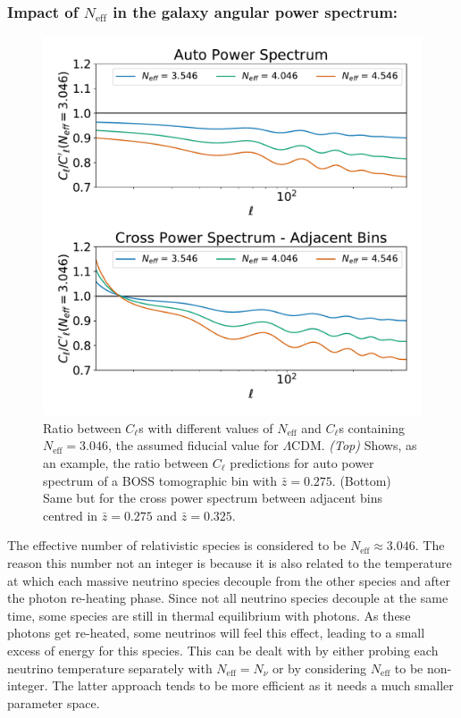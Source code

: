 \subsubsection{Impact of $N_{\text{eff}}$ in the galaxy angular power spectrum:}
\begin{figure}
\begin{center}
\includegraphics[scale=0.50]{Neutrino-FIGS/Neutrinos_Neff.pdf}
\caption[Impact of the effective number of relativistic species in the angular power spectra of galaxies.]{Ratio between $C_{\ell}$s with different values of $N_{\text{eff}}$ and $C_{\ell}$s containing $N_{\text{eff}} = 3.046$, the assumed fiducial value for $\Lambda$CDM. \textit{(Top)} Shows, as an example, the ratio between $C_{\ell}$ predictions for auto power spectrum of a BOSS tomographic bin with $\bar{z} = 0.275$. (Bottom) Same but for the cross power spectrum between adjacent bins centred in $\bar{z} = 0.275$ and $\bar{z} = 0.325$.}
\label{fig:neutrinoCompareNeff}
\end{center}
\end{figure}

The effective number of relativistic species is considered to be $N_{\text{eff}}\approx 3.046$. The reason this number not an integer is because it is also related to the temperature at which each massive neutrino species decouple from the other species and after the photon re-heating phase. Since not all neutrino species decouple at the same time, some species are still in thermal equilibrium with photons. As these photons get re-heated, some neutrinos will feel this effect, leading to a small excess of energy for this species. This can be dealt with by either probing each neutrino temperature separately with $N_{\text{eff}}=N_{\nu}$ or by considering $N_{\text{eff}}$ to be non-integer. The latter approach tends to be more efficient as it needs a much smaller parameter space.

